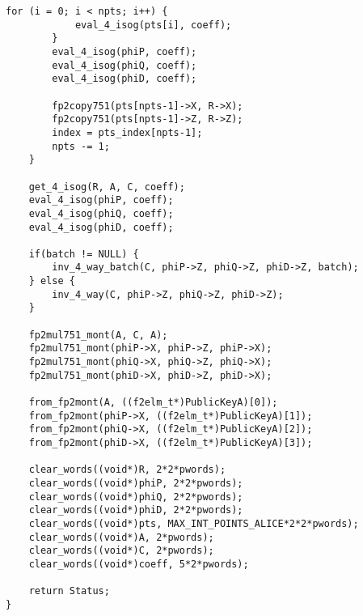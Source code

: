 \begin{lstlisting}[basicstyle=\tiny,]
		for (i = 0; i < npts; i++) {
			eval_4_isog(pts[i], coeff);
		}
		eval_4_isog(phiP, coeff);
		eval_4_isog(phiQ, coeff);
		eval_4_isog(phiD, coeff);

		fp2copy751(pts[npts-1]->X, R->X);
		fp2copy751(pts[npts-1]->Z, R->Z);
		index = pts_index[npts-1];
		npts -= 1;
	}

	get_4_isog(R, A, C, coeff);
	eval_4_isog(phiP, coeff);
	eval_4_isog(phiQ, coeff);
	eval_4_isog(phiD, coeff);

	if(batch != NULL) {
		inv_4_way_batch(C, phiP->Z, phiQ->Z, phiD->Z, batch);
	} else {
		inv_4_way(C, phiP->Z, phiQ->Z, phiD->Z);
	}

	fp2mul751_mont(A, C, A);
	fp2mul751_mont(phiP->X, phiP->Z, phiP->X);
	fp2mul751_mont(phiQ->X, phiQ->Z, phiQ->X);
	fp2mul751_mont(phiD->X, phiD->Z, phiD->X);

	from_fp2mont(A, ((f2elm_t*)PublicKeyA)[0]);
	from_fp2mont(phiP->X, ((f2elm_t*)PublicKeyA)[1]);
	from_fp2mont(phiQ->X, ((f2elm_t*)PublicKeyA)[2]);
	from_fp2mont(phiD->X, ((f2elm_t*)PublicKeyA)[3]);

	clear_words((void*)R, 2*2*pwords);
	clear_words((void*)phiP, 2*2*pwords);
	clear_words((void*)phiQ, 2*2*pwords);
	clear_words((void*)phiD, 2*2*pwords);
	clear_words((void*)pts, MAX_INT_POINTS_ALICE*2*2*pwords);
	clear_words((void*)A, 2*pwords);
	clear_words((void*)C, 2*pwords);
	clear_words((void*)coeff, 5*2*pwords);

	return Status;
}
\end{lstlisting}
